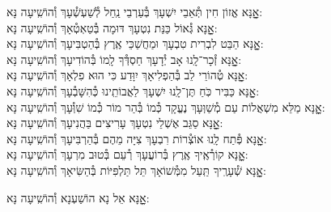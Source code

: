 \documentclass[twoside, openany, parskip=half, 11pt]{book}
\begin{document}
\begin{small}
אׇׇׇׇנָּא אֱזוֹן חִין תְּ֯אֵבֵי יִשְׁעָךְ בְּ֯עַרְבֵי נַֽחַל לְ֯שַׁעְשְׁ֯עָךְ \hfill וְ֯הוֹשִֽׁיעָה נָּא:\\
אׇׇׇׇנָּא גְּ֯אוֹל כַּנַּת נִטְעָךְ דּוּמָה בְּ֯טַאְטְ֯אָךְ \hfill וְ֯הוֹשִֽׁיעָה נָּא:\\
אׇׇׇׇנָּא הַבֵּט לִבְרִית טִבְעָךְ וּמַחֲשַׁכֵּי אֶֽרֶץ בְּ֯הַטְבִּיעָךְ \hfill וְ֯הוֹשִֽׁיעָה נָּא:\\
אׇׇׇׇנָּא זְ֯כָר־לָֽנוּ אָב יְ֯דָעָךְ חַסְדְּ֯ךָ לָֽמוֹ בְּ֯הוֹדִיעָךְ \hfill וְ֯הוֹשִֽׁיעָה נָּא:\\
אׇׇׇׇנָּא טְ֯הוֹרֵי לֵב בְּ֯הַפְלִיאָךְ יִוָּדַע כִּי הוּא פִלְאָךְ \hfill וְ֯הוֹשִֽׁיעָה נָּא:\\
אׇׇׇׇנָּא כַּבִּיר כֹּֽחַ תֶּן־לָֽנוּ יִשְׁעָךְ לַאֲבוֹתֵֽינוּ כְּ֯הִשָּׁבְ֯עָךְ \hfill וְ֯הוֹשִֽׁיעָה נָּא:\\
אׇׇׇׇנָּא מַלֵּא מִשְׁאֲלוֹת עַם מְ֯שַׁוְּעָךְ נֶעֱקָד כְּ֯מוֹ בְּ֯הַר מוֹר כְּ֯מוֹ שִׁוְּ֯עָךְ \hfill וְ֯הוֹשִֽׁיעָה נָּא:\\
אׇׇׇׇנָּא סַגֵּב אֶשְׁלֵי נִטְעָךְ עָרִיצִים בַּהֲנִיעָךְ \hfill וְ֯הוֹשִֽׁיעָה נָּא:\\
אׇׇׇׇנָּא פְּ֯תַח לָֽנוּ אוֹצְ֯רוֹת רִבְעָךְ צִיָּה מֵהֶם בְּ֯הַרְבִּיעָךְ \hfill וְ֯הוֹשִֽׁיעָה נָּא:\\
אׇׇׇׇנָּא קוֹרְ֯אֶֽיךָ אֶֽרֶץ בְּ֯רוֹעֲעָךְ רְ֯עֵם בְּ֯טוּב מִרְעָךְ \hfill וְ֯הוֹשִֽׁיעָה נָּא:\\
אׇׇׇׇנָּא שְׁ֯עָרֶֽיךָ תַּֽעַל מִמְּ֯שׁוֹאָךְ תֵּל תַּלְפִּיּוֹת בְּ֯הַשִּׂיאָךְ \hfill וְ֯הוֹשִֽׁיעָה נָּא:

\end{small}

\begin{large}
\shatzvkahal
אׇׇׇׇנָּא אֵל נָא הוֹשַׁעְנָא וְ֯הוֹשִֽׁיעָה נָּא:

\end{large}
\end{document}
